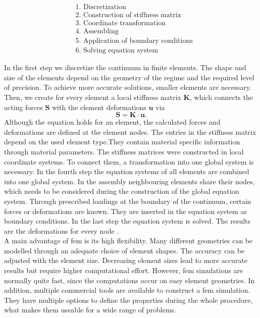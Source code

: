 \begin{align*}
    &\text{1. Discretization} \\
    &\text{2. Construction of stiffness matrix}\\ 
    &\text{3. Coordinate transformation} \\
    &\text{4. Assembling} \\
    &\text{5. Application of boundary conditions} \\
    &\text{6. Solving equation system}
\end{align*}

In the first step we discretize the continuum in finite elements. The shape and size of the elements depend on the geometry of the regime and the required level of precision. To achieve more accurate solutions, smaller elements are necessary. Then, we create for every element a local stiffness matrix $\boldsymbol{K}$, which connects the acting forces $\boldsymbol{S}$ with the element deformations $\boldsymbol{u}$ via 
\begin{equation}
    \boldsymbol{S} =  \boldsymbol{K} \cdot \boldsymbol{u}.
\end{equation}
Although the equation holds for an element, the calculated forces and deformations are defined at the element nodes. The entries in the stiffness matrix depend on the used element type.They contain material specific information through material parameters. The stiffness matrices were constructed in local coordinate systems. To connect them, a transformation into one global system is necessary. In the fourth step the equation systems of all elements are combined into one global system. In the assembly neighbouring elements share their nodes, which needs to be considered during the construction of the global equation system. Through prescribed loadings at the boundary of the continuum, certain forces or deformations are known. They are inserted in the equation system as boundary conditions. In the last step the equation system is solved. The results are the deformations for every node \cite{willner_vorlesungsskript_nodate}\cite{jagota_finite_nodate}. \\
A main advantage of \acrshort{fem} is its high flexibility. Many different geometries can be modelled through an adequate choice of element shapes. The accuracy can be adjusted with the element size. Decreasing element sizes lead to more accurate results but require higher computational effort. However, \acrshort{fem} simulations are normally quite fast, since the computations occur on easy element geometries. In addition, multiple commercial tools are available to construct a \acrshort{fem} simulation. They have multiple options to define the properties during the whole procedure, what makes them useable for a wide range of problems. \\

